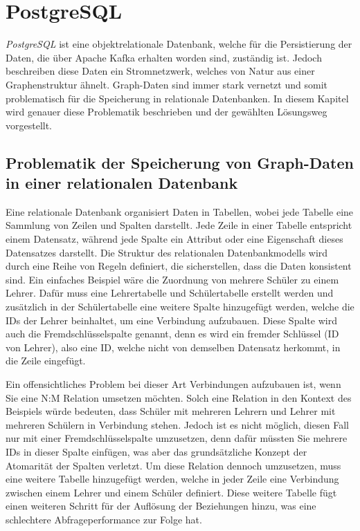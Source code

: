 \section{PostgreSQL}
\label{postgresImpl}

\emph{PostgreSQL} ist eine objektrelationale Datenbank, welche für die Persistierung der Daten, die über Apache Kafka erhalten worden sind, zuständig ist. Jedoch beschreiben diese Daten ein Stromnetzwerk, welches von Natur aus einer Graphenstruktur ähnelt. Graph-Daten sind immer stark vernetzt und somit problematisch für die Speicherung in relationale Datenbanken. In diesem Kapitel wird genauer diese Problematik beschrieben und der gewählten Lösungsweg vorgestellt. 

\subsection{Problematik der Speicherung von Graph-Daten in einer relationalen Datenbank}
Eine relationale Datenbank organisiert Daten in Tabellen, wobei jede Tabelle eine Sammlung von Zeilen und Spalten darstellt. Jede Zeile in einer Tabelle entspricht einem Datensatz, während jede Spalte ein Attribut oder eine Eigenschaft dieses Datensatzes darstellt. Die Struktur des relationalen Datenbankmodells wird durch eine Reihe von Regeln definiert, die sicherstellen, dass die Daten konsistent sind. Ein einfaches Beispiel wäre die Zuordnung von mehrere Schüler zu einem Lehrer. Dafür muss eine Lehrertabelle und Schülertabelle erstellt werden und zusätzlich in der Schülertabelle eine weitere Spalte hinzugefügt werden, welche die IDs der Lehrer beinhaltet, um eine Verbindung aufzubauen. Diese Spalte wird auch die Fremdschlüsselspalte genannt, denn es wird ein fremder Schlüssel (ID von Lehrer), also eine ID, welche nicht von demselben Datensatz herkommt, in die Zeile eingefügt. 

Ein offensichtliches Problem bei dieser Art Verbindungen aufzubauen ist, wenn Sie eine N:M Relation umsetzen möchten. Solch eine Relation in den Kontext des Beispiels würde bedeuten, dass Schüler mit mehreren Lehrern und Lehrer mit mehreren Schülern in Verbindung stehen. Jedoch ist es nicht möglich, diesen Fall nur mit einer Fremdschlüsselspalte umzusetzen, denn dafür müssten Sie mehrere IDs in dieser Spalte einfügen, was aber das grundsätzliche Konzept der Atomarität der Spalten verletzt. Um diese Relation dennoch umzusetzen, muss eine weitere Tabelle hinzugefügt werden, welche in jeder Zeile eine Verbindung zwischen einem Lehrer und einem Schüler definiert. Diese weitere Tabelle fügt einen weiteren Schritt für der Auflösung der Beziehungen hinzu, was eine schlechtere Abfrageperformance zur Folge hat. 

